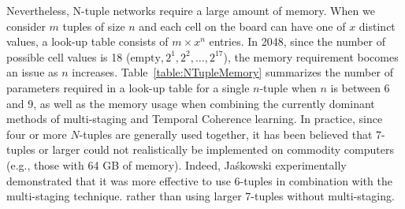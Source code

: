 Nevertheless, N-tuple networks require a large amount of memory.
When we consider $m$ tuples of size $n$ and each cell on the board can have one of $x$ distinct values, a look-up table consists of $m \times x^n$ entries.
In 2048, since the number of possible cell values is 18 ($\mbox{empty}, 2^1, 2^2, \ldots, 2^{17}$), the memory requirement bocomes an issue as $n$ increases.
Table~\ref{table:NTupleMemory} summarizes the number of parameters required in a look-up table for a single $n$-tuple when $n$ is between 6 and 9, as well as the memory usage when combining the currently dominant methods of multi-staging and Temporal Coherence learning.
In practice, since four or more $N$-tuples are generally used together, it has been believed that 7-tuples or larger could not realistically be implemented on commodity computers (e.g., those with 64 GB of memory).
Indeed, Ja\'skowski experimentally demonstrated that it was more effective to use 6-tuples in combination with the multi-staging technique. rather than using larger 7-tuples without multi-staging.


